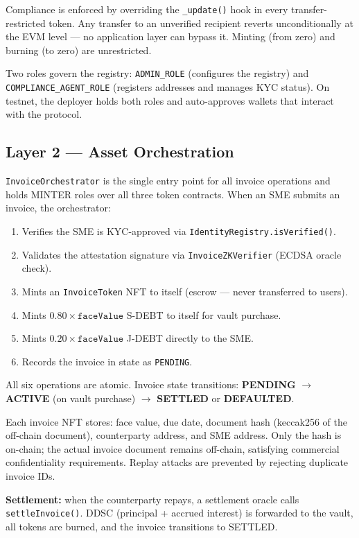 \documentclass[11pt,a4paper]{article}
\begin{document}
Compliance is enforced by overriding the \texttt{\_update()} hook in every transfer-restricted
token. Any transfer to an unverified recipient reverts unconditionally at the EVM level — no
application layer can bypass it. Minting (from zero) and burning (to zero) are unrestricted.

Two roles govern the registry: \texttt{ADMIN\_ROLE} (configures the registry) and
\texttt{COMPLIANCE\_AGENT\_ROLE} (registers addresses and manages KYC status). On testnet,
the deployer holds both roles and auto-approves wallets that interact with the protocol.

\subsection{Layer 2 — Asset Orchestration}

\texttt{InvoiceOrchestrator} is the single entry point for all invoice operations and holds
MINTER roles over all three token contracts. When an SME submits an invoice, the orchestrator:

\begin{enumerate}[leftmargin=2em, topsep=2pt, itemsep=1pt]
  \item Verifies the SME is KYC-approved via \texttt{IdentityRegistry.isVerified()}.
  \item Validates the attestation signature via \texttt{InvoiceZKVerifier} (ECDSA oracle check).
  \item Mints an \texttt{InvoiceToken} NFT to itself (escrow — never transferred to users).
  \item Mints $0.80 \times \texttt{faceValue}$ S-DEBT to itself for vault purchase.
  \item Mints $0.20 \times \texttt{faceValue}$ J-DEBT directly to the SME.
  \item Records the invoice in state as \texttt{PENDING}.
\end{enumerate}

All six operations are atomic. Invoice state transitions: \textbf{PENDING} $\to$
\textbf{ACTIVE} (on vault purchase) $\to$ \textbf{SETTLED} or \textbf{DEFAULTED}.

Each invoice NFT stores: face value, due date, document hash (keccak256 of the off-chain
document), counterparty address, and SME address. Only the hash is on-chain; the actual
invoice document remains off-chain, satisfying commercial confidentiality requirements.
Replay attacks are prevented by rejecting duplicate invoice IDs.

\textbf{Settlement:} when the counterparty repays, a settlement oracle calls
\texttt{settleInvoice()}. DDSC (principal + accrued interest) is forwarded to the vault,
all tokens are burned, and the invoice transitions to SETTLED.
\end{document}
